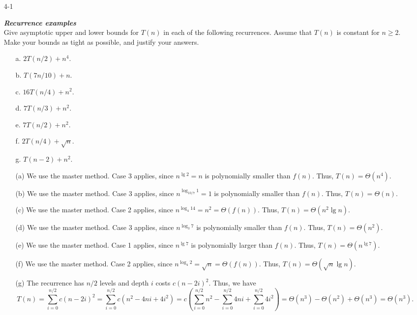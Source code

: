 \begin{enumerate}

\item[4{-}1]{\textbf{\emph{Recurrence examples}}\\
Give asymptotic upper and lower bounds for $T(n)$ in each of the following
recurrences. Assume that $T(n)$ is constant for $n \ge 2$. Make your bounds as
tight as possible, and justify your answers.

\begin{enumerate}
  \item [a.] $2T(n/2) + n^4$.
  \item [b.] $T(7n/10) + n$.
  \item [c.] $16T(n/4) + n^2$.
  \item [d.] $7T(n/3) + n^2$.
  \item [e.] $7T(n/2) + n^2$.
  \item [f.] $2T(n/4) + \sqrt{n}$.
  \item [g.] $T(n - 2) + n^2$.
\end{enumerate}
}

\begin{framed}
\begin{enumerate}
  \item[(a)] We use the master method. Case 3 applies, since $n^{\lg 2} = n$ is
    polynomially smaller than $f(n)$. Thus, $T(n) = \Theta(n^4)$.
  \item[(b)] We use the master method. Case 3 applies, since
    $n^{\log_{10/7} 1} = 1$ is polynomially smaller than $f(n)$. Thus,
    $T(n) = \Theta(n)$.
  \item[(c)] We use the master method. Case 2 applies, since
    $n^{\log_4 14} = n^2 = \Theta(f(n))$. Thus, $T(n) = \Theta(n^2 \lg n)$.
  \item[(d)] We use the master method. Case 3 applies, since $n^{\log_3 7}$ is
    polynomially smaller than $f(n)$. Thus, $T(n) = \Theta(n^2)$.
  \item[(e)] We use the master method. Case 1 applies, since $n^{\lg 7}$ is
    polynomially larger than $f(n)$. Thus, $T(n) = \Theta(n^{\lg 7})$.
  \item[(f)] We use the master method. Case 2 applies, since
    $n^{\log_4 2} = \sqrt n = \Theta(f(n))$. Thus, $T(n) = \Theta(\sqrt n \lg n)$.
  \item[(g)] The recurrence has $n/2$ levels and depth $i$ costs $c(n - 2i)^2$.
    Thus, we have
    \[
      T(n) = \sum_{i = 0}^{n/2} c(n - 2i)^2
           = \sum_{i = 0}^{n/2} c(n^2 - 4ni + 4i^2)
           = c \left(\sum_{i = 0}^{n/2} n^2 - \sum_{i = 0}^{n/2} 4ni + \sum_{i = 0}^{n/2} 4i^2\right)
           = \Theta(n^3) - \Theta(n^2) + \Theta(n^3)
           = \Theta(n^3).
    \]
\end{enumerate}
\end{framed}


\end{enumerate}

